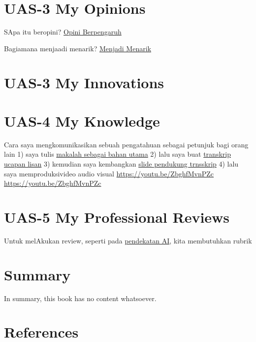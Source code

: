 \documentclass[
  letterpaper,
  DIV=11,
  numbers=noendperiod]{scrreprt}
\begin{document}
\chapter{UAS-3 My Opinions}\label{uas-3-my-opinions}

SApa itu beropini? \href{BM\%20Opini.mp4}{Opini Berpengaruh}

Bagiamana menjaadi menarik? \href{./Interesting.mp4}{Menjadi Menarik}


\chapter{UAS-3 My Innovations}\label{uas-3-my-innovations}


\chapter{UAS-4 My Knowledge}\label{uas-4-my-knowledge}

Cara saya mengkomunikasikan sebuah pengatahuan sebagai petunjuk bagi
orang lain 1) saya tulis
\href{Rekomendasi\%20Presentasi\%20Efektif(Contoh\%20Makalah).pdf}{makalah
sebagai bahan utama} 2) lalu saya buat
\href{Contoh\%20Transkrip\%20Presentasi.pdf}{transkrip ucapan lisan} 3)
kemudian saya kembangkan
\href{Rekomendasi\%20Presentasi\%20(Contoh\%20Slides).pdf}{slide
pendukung trnsskrip} 4) lalu saya memproduksivideo audio visual
\url{https://youtu.be/ZbghfMvnPZc} \url{https://youtu.be/ZbghfMvnPZc}


\chapter{UAS-5 My Professional
Reviews}\label{uas-5-my-professional-reviews}

Untuk melAkukan review, seperti pada
\href{../My_Personal_Reviews/Doc.5.Mengevaluasi-Esai-Berdasarkan-Rubrik.pdf}{pendekatan
AI}, kita membutuhkan rubrik


\chapter{Summary}\label{summary}

In summary, this book has no content whatsoever.


\chapter*{References}\label{references}


\label{refs}
\end{document}
